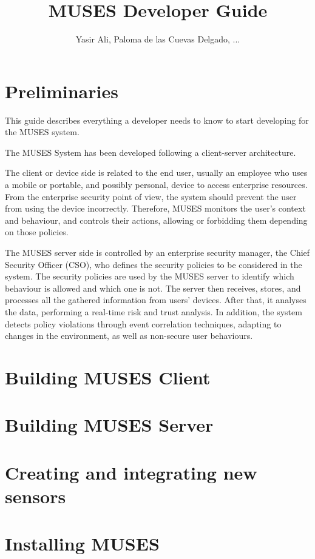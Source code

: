 \documentclass[a4paper,11pt]{book}
\title{MUSES Developer Guide}
\author{Yasir Ali, Paloma de las Cuevas Delgado, ...}
\begin{document}
\maketitle
\tableofcontents

\chapter{Preliminaries}

This guide describes everything a developer needs to know to start developing for the MUSES system.

The MUSES System \cite{deliverable21} has been developed following a client-server architecture.
 
The client or device side is related to the end user, usually an employee who uses a mobile or portable, and possibly
personal, device to access enterprise resources. From the enterprise security point of view, the system should prevent the user from using the device incorrectly. Therefore, MUSES monitors the user's context and behaviour, and controls their actions, allowing or forbidding them depending on those policies.

The MUSES server side is controlled by an enterprise security manager, the Chief Security Officer (CSO), who defines the security policies to be considered in the system. The security policies are used by the MUSES server to identify which behaviour is allowed and which one is not. The server then receives, stores, and processes all the gathered information from users' devices. After that, it analyses the data, performing a real-time risk and trust analysis. In addition, the system detects policy violations through event correlation techniques, adapting to changes in the environment, as well as non-secure user behaviours.

\chapter{Building MUSES Client}


\chapter{Building MUSES Server}


\chapter{Creating and integrating new sensors}


\chapter{Installing MUSES}



\end{document}
